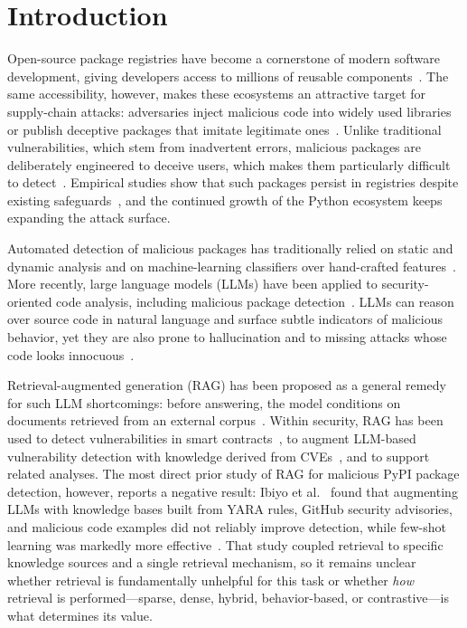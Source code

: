 \section{Introduction}
\label{sec:introduction}

Open-source package registries have become a cornerstone of modern software
development, giving developers access to millions of reusable
components~\cite{duan2021supply}. The same accessibility, however, makes
these ecosystems an attractive target for supply-chain attacks: adversaries
inject malicious code into widely used libraries or publish deceptive
packages that imitate legitimate ones~\cite{huang2024spiderscan,
guo2023pypi, liang2021malicious}. Unlike traditional vulnerabilities, which
stem from inadvertent errors, malicious packages are deliberately engineered
to deceive users, which makes them particularly difficult to
detect~\cite{ease2025rag}. Empirical studies show that such packages persist
in registries despite existing safeguards~\cite{guo2023pypi,
liang2021malicious, ohm2020backstabber}, and the continued growth of the
Python ecosystem keeps expanding the attack surface.

Automated detection of malicious packages has traditionally relied on static
and dynamic analysis and on machine-learning classifiers over hand-crafted
features~\cite{singh2021survey}. More recently, large language models (LLMs)
have been applied to security-oriented code analysis, including malicious
package detection~\cite{zahan2024npm, ease2025rag}. LLMs can reason over
source code in natural language and surface subtle indicators of malicious
behavior, yet they are also prone to hallucination and to missing attacks
whose code looks innocuous~\cite{ullah2024llmsec, ease2025rag}.

Retrieval-augmented generation (RAG) has been proposed as a general remedy
for such LLM shortcomings: before answering, the model conditions on
documents retrieved from an external corpus~\cite{lewis2020rag,
gao2023ragsurvey}. Within security, RAG has been used to detect
vulnerabilities in smart contracts~\cite{yu2024smartcontract}, to augment
LLM-based vulnerability detection with knowledge derived from
CVEs~\cite{du2024vulrag}, and to support related analyses. The most direct
prior study of RAG for malicious PyPI package detection, however, reports a
negative result: Ibiyo et al.~\cite{ease2025rag} found that augmenting LLMs
with knowledge bases built from YARA rules, GitHub security advisories, and
malicious code examples did not reliably improve detection, while few-shot
learning was markedly more effective~\cite{ease2025rag}. That study coupled
retrieval to specific knowledge sources and a single retrieval mechanism, so
it remains unclear whether retrieval is fundamentally unhelpful for this task
or whether \emph{how} retrieval is performed---sparse, dense, hybrid,
behavior-based, or contrastive---is what determines its value.

